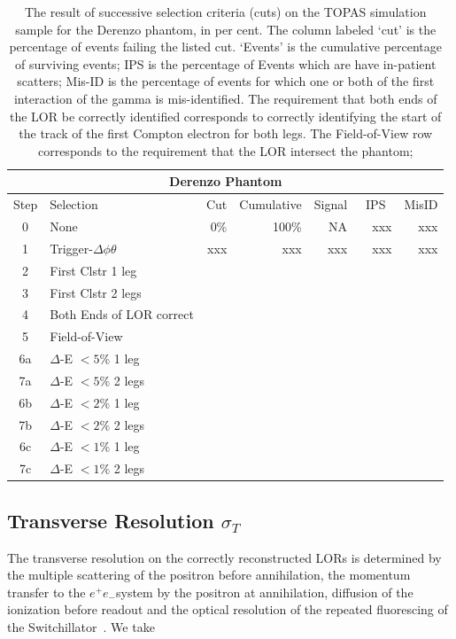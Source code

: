 \documentclass[12pt]{article}
\def\epem{$e^{+} e_{-}$}
\begin{document}
\begin{table}[h]
\centering
\begin{tabular}{||c|l|r||r r r r||}
\hline\hline
\multicolumn{7}{|c|}{\bf Derenzo Phantom}\\
\hline \hline
Step & Selection & Cut & Cumulative  & Signal & ~IPS~ & MisID \\
\hline
0 & None                       & 0\%  & 100\% & NA  & xxx & xxx \\
1 & Trigger-$\Delta\phi\theta$ & xxx & xxx     & xxx & xxx & xxx \\
2 & First Clstr 1 leg  & & & & & \\
3 & First Clstr 2 legs & & & & & \\
4 & Both Ends of LOR correct & & & & & \\
5 & Field-of-View   & & & & & \\

\hline
6a & $\Delta$-E $<5\%$  1 leg   & & & & &\\
7a & $\Delta$-E $<5\%$ 2 legs   & & & & & \\
\hline
6b & $\Delta$-E $<2\%$  1 leg   & & & & &\\
7b & $\Delta$-E $<2\%$ 2 legs   & & & & & \\
\hline
6c & $\Delta$-E $<1\%$  1 leg   & & & & &  \\
7c & $\Delta$-E $<1\%$ 2 legs   & & & & & \\
\hline\hline
\end{tabular}
\caption{The result of successive selection criteria (cuts) on the TOPAS simulation sample
for the Derenzo phantom, in per cent. The column labeled `cut' is the percentage of events
failing the listed cut. `Events' is the cumulative percentage of surviving events;
IPS is the percentage of Events which are have in-patient scatters; Mis-ID is the percentage of
events for which one or both of the first interaction of the gamma is
mis-identified. The requirement that both ends of the LOR be correctly identified corresponds to correctly identifying the start of the track of the first Compton electron for both legs. The Field-of-View row corresponds to the requirement that the LOR intersect the phantom; }
\label{tab:selection_efficiencies}
\end{table}


\subsection{Transverse Resolution $\sigma_T$}
\label{Sigma_T} The transverse resolution on the correctly reconstructed LORs is determined by the multiple scattering of the positron before annihilation, the momentum transfer to the \epem system by the positron at annihilation, diffusion of the ionization before readout and the optical resolution of the repeated fluorescing of the Switchillator~\cite{catchall_NIM_references}. We take
\end{document}
